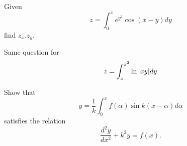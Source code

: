 \documentclass[11pt]{amsbook}
\begin{document}
\setcounter{page}{310}
\setcounter{section}{4}
\setcounter{exercise}{62}
\begin{exercise}
	Given
	\begin{equation*}
		z = \int_{0}^{x} e^{y^2} \cos{(x-y)}dy
	\end{equation*}
	find $ z_x.z_y$.
\end{exercise}

\begin{exercise}
	Same question for
	\begin{equation*}
		z = \int_{x}^{x^2} \ln{\arrowvert xy \arrowvert}dy
	\end{equation*}
\end{exercise}

\begin{exercise}
	Show that
	\begin{equation*}
		y = \frac{1}{k} \int_{0}^{x} f(\alpha) \sin{k(x-\alpha)} d\alpha
	\end{equation*}
	satisfies the relation
	\begin{equation*}
		\frac{d^2y}{dx^2} + k^2y = f(x).
	\end{equation*}
\end{exercise}
\end{document}
